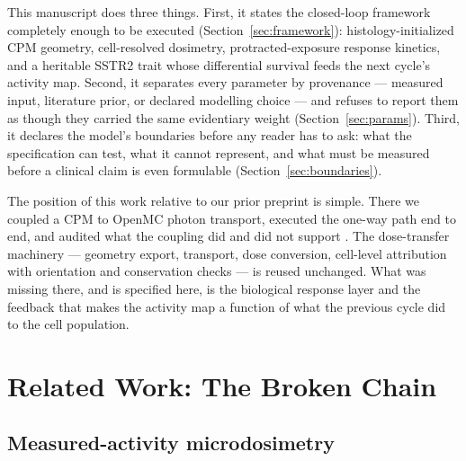 \documentclass[11pt]{article}
\begin{document}
This manuscript does three things. First, it states the closed-loop framework completely enough to be executed
(Section~\ref{sec:framework}): histology-initialized CPM geometry, cell-resolved dosimetry,
protracted-exposure response kinetics, and a heritable SSTR2 trait whose differential
survival feeds the next cycle's activity map. Second, it separates every parameter by provenance ---
measured input, literature prior, or declared modelling choice --- and refuses to report
them as though they carried the same evidentiary weight (Section~\ref{sec:params}).
Third, it declares the model's boundaries before any reader has to ask: what the
specification can test, what it cannot represent, and what must be measured before a
clinical claim is even formulable (Section~\ref{sec:boundaries}).

The position of this work relative to our prior preprint is simple. There we coupled a CPM
to OpenMC photon transport, executed the one-way path end to end, and audited what the
coupling did and did not support \cite{kinder2026biofilm}. The dose-transfer machinery ---
geometry export, transport, dose conversion, cell-level attribution with orientation and
conservation checks --- is reused unchanged. What was missing there, and is specified here,
is the biological response layer and the feedback that makes the activity map a function of
what the previous cycle did to the cell population.

\section{Related Work: The Broken Chain}\label{sec:gap}

\subsection{Measured-activity microdosimetry}
\end{document}

